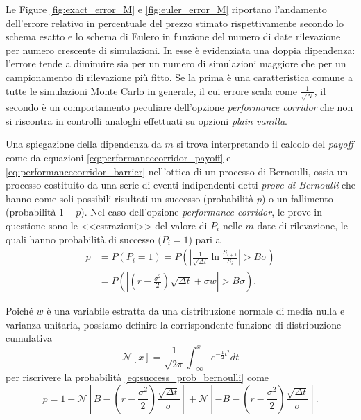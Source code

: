 Le Figure \ref{fig:exact_error_M} e \ref{fig:euler_error_M} riportano l'andamento dell'errore relativo in percentuale del prezzo stimato rispettivamente secondo lo schema esatto e lo schema di Eulero in funzione del numero di date rilevazione per numero crescente di simulazioni. In esse è evidenziata una doppia dipendenza: l'errore tende a diminuire sia per un numero di simulazioni maggiore che per un campionamento di rilevazione più fitto. Se la prima è una caratteristica comune a tutte le simulazioni Monte Carlo in generale, il cui errore scala come $\frac{1}{\sqrt{N}}$, il secondo è un comportamento peculiare dell'opzione \textit{performance corridor} che non si riscontra in controlli analoghi effettuati su opzioni \textit{plain vanilla}.

Una spiegazione della dipendenza da $m$ si trova interpretando il calcolo del \textit{payoff} come da equazioni \eqref{eq:performancecorridor_payoff} e \eqref{eq:performancecorridor_barrier} nell'ottica di un processo di Bernoulli, ossia un processo costituito da una serie di eventi indipendenti detti \textit{prove di Bernoulli} che hanno come soli possibili risultati un successo (probabilità $p$) o un fallimento (probabilità $1-p$). Nel caso dell'opzione \textit{performance corridor}, le prove in questione sono le <<estrazioni>> del valore di $P_i$ nelle $m$ date di rilevazione, le quali hanno probabilità di successo ($P_i=1$) pari a
\begin{equation}
\begin{aligned}
    p &= P(P_i = 1) = P\left(\left| \frac{1}{\sqrt{\Delta t}} \ln{\frac{S_{i+1}}{S_i}} \right| > B \sigma\right) \\
    &= P\left(\left| \left(r - \frac{\sigma^2}{2}\right)\sqrt{\Delta t} + \sigma w \right| > B \sigma\right).
    \label{eq:success_prob_bernoulli}
\end{aligned}
\end{equation}

Poiché $w$ è una variabile estratta da una distribuzione normale di media nulla e varianza unitaria, possiamo definire la corrispondente funzione di distribuzione cumulativa
\begin{equation}
    \mathcal{N}[x] = \frac{1}{\sqrt{2\pi}} \int_{-\infty}^x{e^{-\frac{1}{2} t^2} dt}
    \label{eq:cumulative_gaussian}
\end{equation}
per riscrivere la probabilità \eqref{eq:success_prob_bernoulli} come
\begin{equation}
    p = 1 - \mathcal{N}\left[B - \left(r - \frac{\sigma^2}{2}\right)\frac{\sqrt{\Delta t}}{\sigma} \right] + \mathcal{N}\left[- B - \left(r - \frac{\sigma^2}{2}\right)\frac{\sqrt{\Delta t}}{\sigma} \right].
    \label{eq:success_prob_cumul}
\end{equation}

